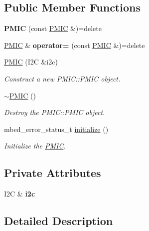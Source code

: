 \subsection*{Public Member Functions}
\begin{DoxyCompactItemize}
\item 
\mbox{\label{class_p_m_i_c_a450469089bc43da3e0e32510fe4ff34d}} 
{\bfseries P\+M\+IC} (const \mbox{\hyperlink{class_p_m_i_c}{P\+M\+IC}} \&)=delete
\item 
\mbox{\label{class_p_m_i_c_ac9f5ecb5ee78181541fa5bbd2cbfe567}} 
\mbox{\hyperlink{class_p_m_i_c}{P\+M\+IC}} \& {\bfseries operator=} (const \mbox{\hyperlink{class_p_m_i_c}{P\+M\+IC}} \&)=delete
\item 
\mbox{\hyperlink{class_p_m_i_c_ab687d3b9ff14729e6ea439fd246f542f}{P\+M\+IC}} (I2C \&i2c)
\begin{DoxyCompactList}\small\item\em Construct a new P\+M\+I\+C\+::\+P\+M\+IC object. \end{DoxyCompactList}\item 
\mbox{\hyperlink{class_p_m_i_c_a68ddf66e3dab8a38dac9f026cfbb2b30}{$\sim$\+P\+M\+IC}} ()
\begin{DoxyCompactList}\small\item\em Destroy the P\+M\+I\+C\+::\+P\+M\+IC object. \end{DoxyCompactList}\item 
mbed\+\_\+error\+\_\+status\+\_\+t \mbox{\hyperlink{class_p_m_i_c_ae899cdd3d66ecef345c748f9c42b5399}{initialize}} ()
\begin{DoxyCompactList}\small\item\em Initialize the \mbox{\hyperlink{class_p_m_i_c}{P\+M\+IC}}. \end{DoxyCompactList}\end{DoxyCompactItemize}
\subsection*{Private Attributes}
\begin{DoxyCompactItemize}
\item 
\mbox{\label{class_p_m_i_c_acfff4810aca9fb929e16160fcdc998d7}} 
I2C \& {\bfseries i2c}
\end{DoxyCompactItemize}


\subsection{Detailed Description}


